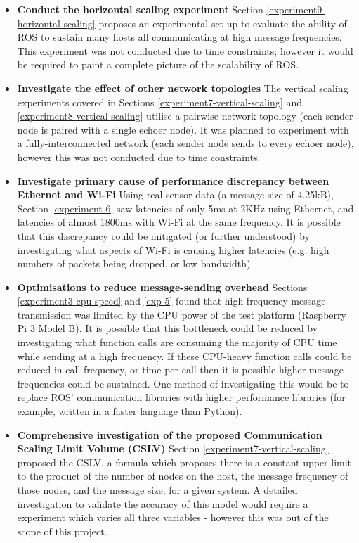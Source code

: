 \documentclass[../dissertation.tex]{subfiles}
\begin{document}
\begin{itemize}

  \item \textbf{Conduct the horizontal scaling experiment} Section \ref{experiment9-horizontal-scaling} proposes an experimental set-up to evaluate the ability of ROS to sustain many hosts all communicating at high message frequencies. This experiment was not conducted due to time constraints; however it would be required to paint a complete picture of the scalability of ROS.

  \item \textbf{Investigate the effect of other network topologies} The vertical scaling experiments covered in Sections \ref{experiment7-vertical-scaling} and \ref{experiment8-vertical-scaling} utilise a pairwise network topology (each sender node is paired with a single echoer node). It was planned to experiment with a fully-interconnected network (each sender node sends to every echoer node), however this was not conducted due to time constraints.

  \item \textbf{Investigate primary cause of performance discrepancy between Ethernet and Wi-Fi} Using real sensor data (a message size of 4.25kB), Section \ref{experiment-6} saw latencies of only 5ms at 2KHz using Ethernet, and latencies of almost 1800ms with Wi-Fi at the same frequency. It is possible that this discrepancy could be mitigated (or further understood) by investigating what aspects of Wi-Fi is causing higher latencies (e.g. high numbers of packets being dropped, or low bandwidth).

  \item \textbf{Optimisations to reduce message-sending overhead} Sections \ref{experiment3-cpu-speed} and \ref{exp-5} found that high frequency message transmission was limited by the CPU power of the test platform (Raspberry Pi 3 Model B). It is possible that this bottleneck could be reduced by investigating what function calls are consuming the majority of CPU time while sending at a high frequency. If these CPU-heavy function calls could be reduced in call frequency, or time-per-call then it is possible higher message frequencies could be sustained. One method of investigating this would be to replace ROS' communication libraries with higher performance libraries (for example, written in a faster language than Python).

  \item \textbf{Comprehensive investigation of the proposed Communication Scaling Limit Volume (CSLV)} Section \ref{experiment7-vertical-scaling} proposed the CSLV, a formula which proposes there is a constant upper limit to the product of the number of nodes on the host, the message frequency of those nodes, and the message size, for a given system. A detailed investigation to validate the accuracy of this model would require a experiment which varies all three variables - however this was out of the scope of this project.


\end{itemize}
\end{document}
